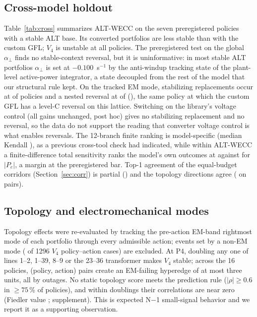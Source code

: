 \documentclass[journal]{IEEEtran}
\theoremstyle{remark}
\newcommand{\aperp}{\alpha_{\perp}}
\begin{document}
\subsection{Cross-model holdout}\label{sec:cross}
Table~\ref{tab:cross} summarizes ALT-WECC on the seven preregistered policies
with a stable ALT base. Its converted portfolios are less stable than with the
custom GFL; $V_4$ is unstable at all policies. The preregistered test on the
global $\aperp$ finds no stable-context reversal, but it is uninformative: in
most stable ALT portfolios $\aperp$ is set at $-0.100$~s$^{-1}$ by the anti-windup
tracking state of the plant-level active-power integrator, a state decoupled
from the rest of the model that our structural rule kept. On the tracked EM mode,
stabilizing replacements occur at \altEmStab{} of \altEmN{} policies and a nested reversal at \altEmRev{} of
\altEmN{} (\altEmPol), the same policy at which the custom GFL has a level-C reversal on this
lattice.
Switching on the library's voltage control (all gains unchanged, post hoc) gives
no stabilizing replacement and no reversal, so the data do not support the
reading that converter voltage control is what enables reversals. The 12-branch
finite ranking is model-specific (median Kendall \altCMedianKendall), as a previous
cross-tool check had indicated, while within ALT-WECC a finite-difference total
sensitivity ranks the model's own outcomes at \altCMedianRhoAltfd{} against
\altCMedianRhoS{} for $|P_e|$, a margin at the preregistered bar. Top-1 agreement
of the equal-budget corridors (Section~\ref{sec:corr}) is partial (\altDFracTopAgree) and the
topology directions agree (\altEPooledSignAgree{} on \altENPairs{} pairs).



\subsection{Topology and electromechanical modes}
Topology effects were re-evaluated by tracking the pre-action EM-band rightmost
mode of each portfolio through every admissible action; events set by a non-EM
mode (\topoFastHfour{} of 1296 $V_4$ policy--action cases) are excluded. At P4,
doubling any one of lines 1--2, 1--39, 8--9 or the 23--36 transformer makes $V_4$
stable; across the 16 policies, \topoNcreate{} (policy, action) pairs create an
EM-failing hyperedge of at most three units, all by outages. No static topology
score meets the prediction rule ($|\rho|\ge0.6$ in $\ge75$\,\% of policies), and
within doublings their correlations are near zero (Fiedler value
\withinDblFiedler; supplement). This is expected N$-$1 small-signal behavior and
we report it as a supporting observation.
\end{document}

